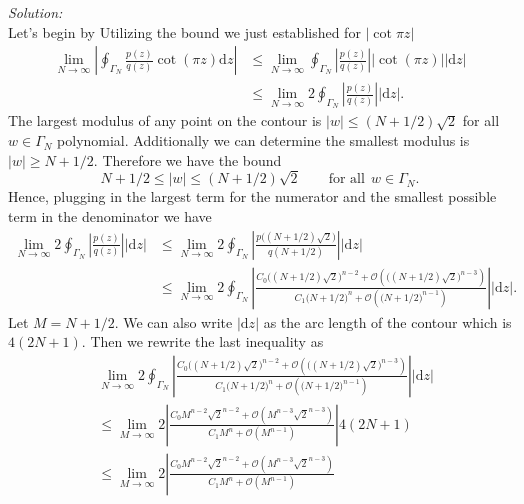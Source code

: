 \documentclass[10pt]{amsart}
\newcommand{\D}{\mathrm{d}}
\theoremstyle{nonumberplain}
\begin{document}
\begin{enumerate}[label={\bf {\arabic*}:}]
\begin{enumerate}
\noindent
\textit{Solution:} \\
Let's begin by Utilizing the bound we just established for $|\cot \pi z|$
\begin{align*}
\lim_{N \rightarrow \infty}\left| \oint_{\Gamma_N} \frac{p(z)}{q(z)} \cot (\pi z) \D z \right|
	&\leq \lim_{N \rightarrow \infty} \oint_{\Gamma_N} \left|\frac{p(z)}{q(z)}\right| |\cot (\pi z)| |\D z| \\
	&\leq \lim_{N \rightarrow \infty} 2 \oint_{\Gamma_N} \left|\frac{p(z)}{q(z)}\right| |\D z|.
\end{align*}
The largest modulus of any point on the contour is $|w| \leq (N + 1/2) \sqrt 2$ for all $w \in \Gamma_N$ polynomial.
Additionally we can determine the smallest modulus is $|w| \geq N + 1/2$.
Therefore we have the bound
$$
N + 1/2 \leq |w| \leq (N + 1/2)\sqrt 2 \quad\quad \text{for all} ~~ w \in \Gamma_N.
$$
Hence, plugging in the largest term for the numerator and the smallest possible term in the denominator we have
\begin{align*}
\lim_{N \rightarrow \infty} 2 \oint_{\Gamma_N} \left|\frac{p(z)}{q(z)}\right| |\D z|
	&\leq \lim_{N \rightarrow \infty} 2 \oint_{\Gamma_N} \left|\frac{p\big( (N + 1/2)\sqrt2 \big)}{q(N + 1/2)}\right| |\D z| \\
	&\leq \lim_{N \rightarrow \infty} 2 \oint_{\Gamma_N} \left| 
		\frac{ C_0 \Big( (N + 1/2)\sqrt2 \Big)^ {n - 2}
			+ \mathcal O \left(\Big( (N + 1/2)\sqrt2 \Big)^ {n - 3} \right)}
			{C_1 \Big( N + 1/2 \Big)^ n
			+ \mathcal O \left(\Big( N + 1/2 \Big)^ {n - 1} \right)}
		\right| |\D z|.
\end{align*}
Let $M = N + 1/2$.
We can also write $|\D z|$ as the arc length of the contour which is $4(2N + 1)$.
Then we rewrite the last inequality as
\begin{align*}
&\lim_{N \rightarrow \infty} 2 \oint_{\Gamma_N} \left| 
	\frac{ C_0 \Big( (N + 1/2)\sqrt2 \Big)^ {n - 2}
	+ \mathcal O \left(\Big( (N + 1/2)\sqrt2 \Big)^ {n - 3} \right)}
	{C_1 \Big( N + 1/2 \Big)^ n
	+ \mathcal O \left(\Big( N + 1/2 \Big)^ {n - 1} \right)}
	\right| |\D z| \\
&\leq \lim_{M \rightarrow \infty} 2 \left| 
	\frac{ C_0 M^{n - 2} \sqrt{2}^{n - 2}
	+ \mathcal O \left( M^{n - 3} \sqrt{2}^{n - 3} \right)}
	{C_1 M^n
	+ \mathcal O \left( M^{n-1} \right)}
	\right| 4(2N + 1) \\
&\leq \lim_{M \rightarrow \infty} 2 \left| 
	\frac{ C_0 M^{n - 2} \sqrt{2}^{n - 2}
	+ \mathcal O \left( M^{n - 3} \sqrt{2}^{n - 3} \right)}
	{C_1 M^n
	+ \mathcal O \left( M^{n-1} \right)}

\end{align*}
\end{enumerate}
\end{enumerate}
\end{document}

